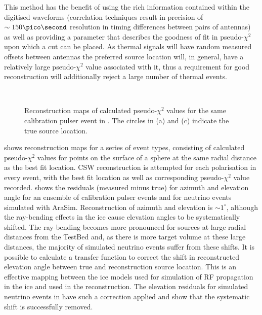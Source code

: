  This method has the benefit of using the rich information contained within the digitised waveforms (correlation techniques result in precision of $\sim 150 \pico \second$ resolution in timing differences between pairs of antennas) as well as providing a parameter that describes the goodness of fit in pseudo-$\chi^2$ upon which a cut can be placed. As thermal signals will have random measured offsets between antennas the preferred source location will, in general, have a relatively large pseudo-$\chi^2$ value associated with it, thus a requirement for good reconstruction will additionally reject a large number of thermal events.

\begin{figure}[htpb]
  \hfill
  \\
  \caption{Reconstruction maps of calculated pseudo-$\chi^{2}$ values for the same calibration pulser event in . The circles in (a) and (c) indicate the true source location.}
  \label{fig:analysis:Reconstruction:CSW-ChiSq-Example}
\end{figure}

 shows reconstruction maps for a series of event types, consisting of calculated pseudo-$\chi^{2}$ values for points on the surface of a sphere at the same radial distance as the best fit location. CSW reconstruction is attempted for each polarisation in every event, with the best fit location as well as corresponding pseudo-$\chi^{2}$ value recorded.  shows the residuals (measured minus true) for azimuth and elevation angle for an ensemble of calibration pulser events and for neutrino events simulated with AraSim. Reconstruction of azimuth and elevation is $\sim 1^{\circ}$, although the ray-bending effects in the ice cause elevation angles to be systematically shifted. The ray-bending becomes more pronounced for sources at large radial distances from the TestBed and, as there is more target volume at these large distances, the majority of simulated neutrino events  suffer from these shifts. It is possible to calculate a transfer function to correct the shift in reconstructed elevation angle between true and reconstruction source location. This is an effective mapping between the ice models used for simulation of RF propagation in the ice and used in the reconstruction. The elevation residuals for simulated neutrino events in  have such a correction applied and show that the systematic shift is successfully removed.


